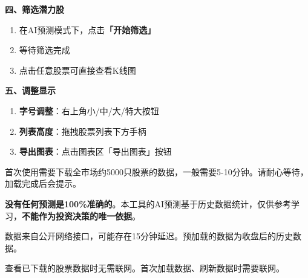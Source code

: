 \documentclass[14pt,a4paper]{ctexart}
\newcommand{\sectitle}[1]{\vspace{1em}{\Large\bfseries\color{darkwarning} #1}\vspace{0.3em}}
\begin{document}
\vspace{1em}
\textbf{四、筛选潜力股}
\begin{enumerate}[leftmargin=2em]
  \item 在AI预测模式下，点击\textbf{「开始筛选」}
  \item 等待筛选完成
  \item 点击任意股票可直接查看K线图
\end{enumerate}

\vspace{1em}
\textbf{五、调整显示}
\begin{enumerate}[leftmargin=2em]
  \item \textbf{字号调整}：右上角小/中/大/特大按钮
  \item \textbf{列表高度}：拖拽股票列表下方手柄
  \item \textbf{导出图表}：点击图表区「导出图表」按钮
\end{enumerate}

\newpage

\sectitle{第五部分：常见问题（FAQ）}

\large

\begin{tcolorbox}[colback=gray!10!white,colframe=gray!70!black,title=\textbf{Q1：预加载要多久？},fonttitle=\bfseries]
首次使用需要下载全市场约5000只股票的数据，一般需要5-10分钟。请耐心等待，加载完成后会提示。
\end{tcolorbox}

\vspace{0.8em}
\begin{tcolorbox}[colback=gray!10!white,colframe=gray!70!black,title=\textbf{Q2：AI预测准吗？},fonttitle=\bfseries]
\textbf{没有任何预测是100\%准确的}。本工具的AI预测基于历史数据统计，仅供参考学习，\textbf{不能作为投资决策的唯一依据}。
\end{tcolorbox}

\vspace{0.8em}
\begin{tcolorbox}[colback=gray!10!white,colframe=gray!70!black,title=\textbf{Q3：数据是实时的吗？},fonttitle=\bfseries]
数据来自公开网络接口，可能存在15分钟延迟。预加载的数据为收盘后的历史数据。
\end{tcolorbox}

\vspace{0.8em}
\begin{tcolorbox}[colback=gray!10!white,colframe=gray!70!black,title=\textbf{Q4：需要联网吗？},fonttitle=\bfseries]
查看已下载的股票数据时无需联网。首次加载数据、刷新数据时需要联网。
\end{tcolorbox}
\end{document}

